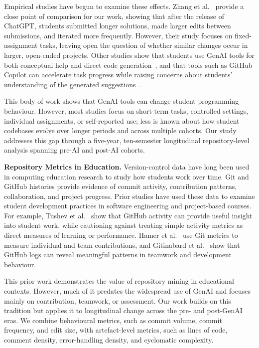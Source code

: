 \documentclass[sigconf,authorversion]{acmart}
\begin{document}
Empirical studies have begun to examine these effects. Zhang et al.~\cite{zhang2026changes} provide a close point of comparison for our work, showing that after the release of ChatGPT, students submitted longer solutions, made larger edits between submissions, and iterated more frequently. However, their study focuses on fixed-assignment tasks, leaving open the question of whether similar changes occur in larger, open-ended projects. Other studies show that students use GenAI tools for both conceptual help and direct code generation~\cite{rahe2025programming}, and that tools such as GitHub Copilot can accelerate task progress while raising concerns about students' understanding of the generated suggestions~\cite{shihab2025effects}.

This body of work shows that GenAI tools can change student programming behaviour. However, most studies focus on short-term tasks, controlled settings, individual assignments, or self-reported use; less is known about how student codebases evolve over longer periods and across multiple cohorts. Our study addresses this gap through a five-year, ten-semester longitudinal repository-level analysis spanning pre-AI and post-AI cohorts.

\textbf{Repository Metrics in Education.}
Version-control data have long been used in computing education research to study how students work over time. Git and GitHub histories provide evidence of commit activity, contribution patterns, collaboration, and project progress. Prior studies have used these data to examine student development practices in software engineering and project-based courses. For example, Tushev et al.~\cite{tushev2020using} show that GitHub activity can provide useful insight into student work, while cautioning against treating simple activity metrics as direct measures of learning or performance. Hamer et al.~\cite{hamer2021using} use Git metrics to measure individual and team contributions, and Gitinabard et al.~\cite{gitinabard2020student} show that GitHub logs can reveal meaningful patterns in teamwork and development behaviour.

This prior work demonstrates the value of repository mining in educational contexts. However, much of it 
predates the widespread use of GenAI and focuses mainly on contribution, teamwork, or assessment. Our work builds on this tradition but applies it to longitudinal change across the pre- and post-GenAI eras. We combine behavioural metrics, such as commit volume, commit frequency, and edit size, with artefact-level metrics, such as lines of code, comment density, error-handling density, and cyclomatic complexity.
\end{document}

